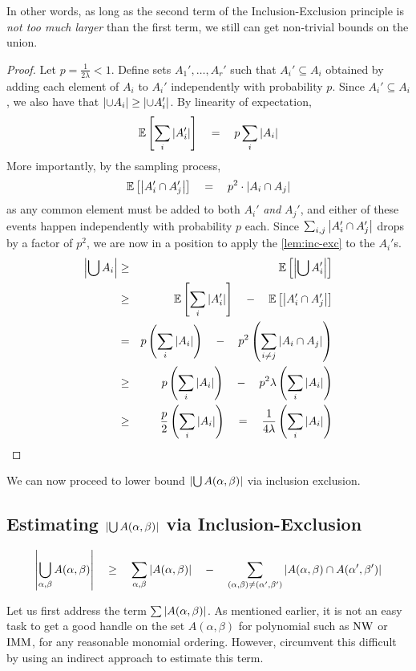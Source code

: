 In other words, as long as the second term of the Inclusion-Exclusion principle is \emph{not too much larger} than the first term, we still can get non-trivial bounds on the union. 

\begin{proof}
Let $p = \frac{1}{2\lambda} < 1$. 
Define sets $A_1',\dots, A_r'$ such that $A_i' \subseteq A_i$ obtained by adding each element of $A_i$ to $A_i'$ independently with probability $p$. 
Since $A_i' \subseteq A_i$, we also have that $\left|\cup A_i\right| \geq \left|\cup  A_i'\right|$. 
By linearity of expectation, 
\[
\mathbb{E}\left[\sum_i \left|A_i'\right|\right] \quad = \quad p \sum_{i} \left|A_i\right| 
\]
More importantly, by the sampling process,
\[
\mathbb{E}\left[\left|A_i' \cap A_j'\right|\right] \quad = \quad p^2 \cdot \left|A_i \cap A_j\right|
\]
as any common element must be added to both $A_i'$ \emph{and} $A_j'$, and either of these events happen independently with probability $p$ each. 
Since $\sum_{i,j}\left|A_i' \cap A_j'\right|$ drops by a factor of $p^2$, we are now in a position to apply the \autoref{lem:inc-exc} to the $A_i'$s. 
\begin{eqnarray*}
\left|\bigcup A_i\right| & \geq &  \mathbb{E}\left[\left|\bigcup A_i'\right|\right]\\
& \geq & \mathbb{E}\left[\sum_i \left|A_i'\right|\right] \quad - \quad \mathbb{E}\left[\left|A_i' \cap A_j'\right|\right]\\
& = & p \left(\sum_i \left|A_i\right|\right) \quad - \quad p^2\left(\sum_{i\neq j}\left|A_i \cap A_j\right|\right)\\
& \geq & p \left(\sum_i \left|A_i\right|\right) \quad - \quad p^2 \lambda \left(\sum_i \left|A_i\right|\right)\\
& \geq & \frac{p}{2} \left(\sum_i \left|A_i\right|\right) \quad = \quad \frac{1}{4\lambda} \left(\sum_i \left|A_i\right|\right)
\end{eqnarray*}
\end{proof}

We can now proceed to lower bound $\left|\bigcup A(\alpha, \beta)\right|$ via inclusion exclusion.

\subsection*{Estimating $\left|\bigcup A(\alpha, \beta)\right|$ via Inclusion-Exclusion}
\[
\left|\bigcup_{\alpha, \beta}A(\alpha,\beta)\right|\quad \geq \quad \sum_{\alpha,\beta}\left|A(\alpha, \beta)\right| \quad - \quad \sum_{(\alpha, \beta)\neq (\alpha',\beta')}\left|A(\alpha, \beta) \cap A(\alpha',\beta')\right|
\]

 Let us first address the term $\sum \left|A(\alpha, \beta)\right|$. 
As mentioned earlier, it is not an easy task to get a good handle on the set $A(\alpha, \beta)$ for polynomial such as $\mathrm{NW}$ or $\mathrm{IMM}$, for any reasonable monomial ordering. 
However, \cite{KS14} circumvent this difficult by using an indirect approach to estimate this term. 

